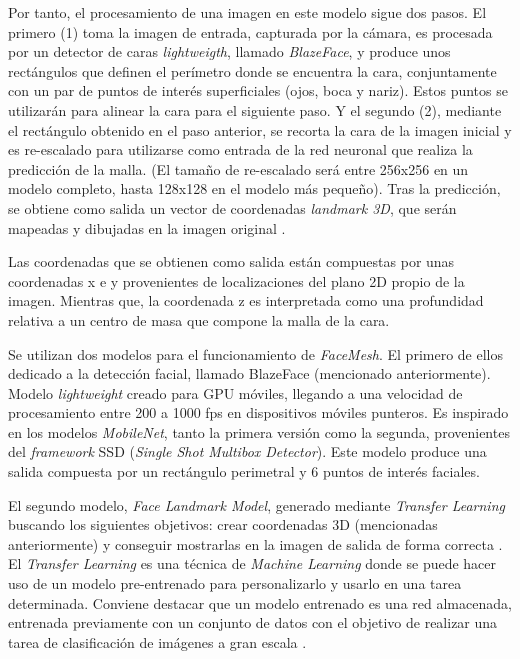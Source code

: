 Por tanto, el procesamiento de una imagen en este modelo sigue dos pasos. El primero (1) toma la imagen de entrada, capturada por la cámara, es procesada por un detector de caras \textit{lightweigth}, llamado \textit{BlazeFace}, y produce unos rectángulos que definen el perímetro donde se encuentra la cara, conjuntamente con un par de puntos de interés superficiales (ojos, boca y nariz). Estos puntos se utilizarán para alinear la cara para el siguiente paso. Y el segundo (2), mediante el rectángulo obtenido en el paso anterior, se recorta la cara de la imagen inicial y es re-escalado para utilizarse como entrada de la red neuronal que realiza la predicción de la malla. (El tamaño de re-escalado será entre 256x256 en un modelo completo, hasta 128x128 en el modelo más pequeño). Tras la predicción, se obtiene como salida un vector de coordenadas \textit{landmark 3D}, que serán mapeadas y dibujadas en la imagen original \cite{faceMesh2}. 

Las coordenadas que se obtienen como salida están compuestas por unas coordenadas x e y provenientes de localizaciones del plano 2D propio de la imagen. Mientras que, la coordenada z es interpretada como una profundidad relativa a un centro de masa que compone la malla de la cara.

Se utilizan dos modelos para el funcionamiento de \textit{FaceMesh}. El primero de ellos dedicado a la detección facial, llamado BlazeFace (mencionado anteriormente). Modelo \textit{lightweight} creado para GPU móviles, llegando a una velocidad de procesamiento entre 200 a 1000 fps en dispositivos móviles punteros. Es inspirado en los modelos \textit{MobileNet}, tanto la primera versión como la segunda, provenientes del \textit{framework} SSD (\textit{Single Shot Multibox Detector}). Este modelo produce una salida compuesta por un rectángulo perimetral y 6 puntos de interés faciales. \cite{blazeface}

El segundo modelo, \textit{Face Landmark Model}, generado mediante \textit{Transfer Learning} buscando los siguientes objetivos: crear coordenadas 3D (mencionadas anteriormente) y conseguir mostrarlas en la imagen de salida de forma correcta \cite{faceMesh}. El \textit{Transfer Learning} es una técnica de \textit{Machine Learning} donde se puede hacer uso de un modelo pre-entrenado para personalizarlo y usarlo en una tarea determinada. Conviene destacar que un modelo entrenado es una red almacenada, entrenada previamente con un conjunto de datos con el objetivo de realizar una tarea de clasificación de imágenes a gran escala \cite{transferLearning}.


